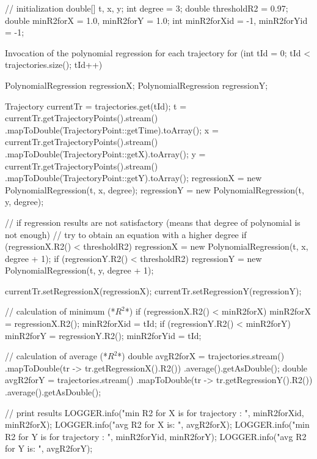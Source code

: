 // initialization
double[] t, x, y;
int degree = 3;
double thresholdR2 = 0.97;
double minR2forX = 1.0, minR2forY = 1.0;
int minR2forXid = -1, minR2forYid = -1;

Invocation of the polynomial regression for each trajectory
for (int tId = 0; tId < trajectories.size(); tId++) {
	PolynomialRegression regressionX;
	PolynomialRegression regressionY;
	
	Trajectory currentTr = trajectories.get(tId);
	t = currentTr.getTrajectoryPoints().stream()
		.mapToDouble(TrajectoryPoint::getTime).toArray();
	x = currentTr.getTrajectoryPoints().stream()
		.mapToDouble(TrajectoryPoint::getX).toArray();
	y = currentTr.getTrajectoryPoints().stream()
		.mapToDouble(TrajectoryPoint::getY).toArray();
	regressionX = new PolynomialRegression(t, x, degree);
	regressionY = new PolynomialRegression(t, y, degree);		

//	  if regression results are not satisfactory (means that degree of polynomial is not enough)
//    try to obtain an equation with a higher degree
	if (regressionX.R2() < thresholdR2)
		regressionX = new PolynomialRegression(t, x, degree + 1);
	if (regressionY.R2() < thresholdR2)
		regressionY = new PolynomialRegression(t, y, degree + 1);
		
	currentTr.setRegressionX(regressionX);
	currentTr.setRegressionY(regressionY);

//    calculation of minimum (*$R^2$*)
	if (regressionX.R2() < minR2forX) {
		minR2forX = regressionX.R2();
		minR2forXid = tId;
	}
	if (regressionY.R2() < minR2forY) {
		minR2forY = regressionY.R2();
		minR2forYid = tId;
	}
}

// calculation of average (*$R^2$*)
double avgR2forX = trajectories.stream()
	.mapToDouble(tr -> tr.getRegressionX().R2())
	.average().getAsDouble();
double avgR2forY = trajectories.stream()
	.mapToDouble(tr -> tr.getRegressionY().R2())
	.average().getAsDouble();

// print results
LOGGER.info("min R2 for X is for trajectory {}: {}", 
	minR2forXid, minR2forX);
LOGGER.info("avg R2 for X is: {}", avgR2forX);
LOGGER.info("min R2 for Y is for trajectory {}: {}", 
	minR2forYid, minR2forY);
LOGGER.info("avg R2 for Y is: {}", avgR2forY);